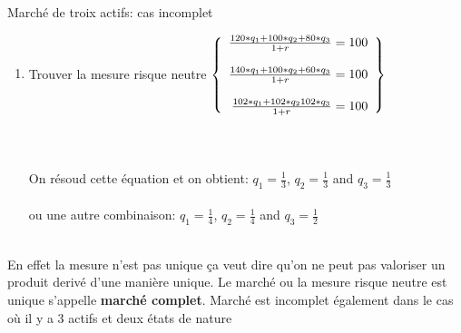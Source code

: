\documentclass[10pt]{beamer}
\begin{document}
\begin{frame}{Marché de troix actifs: cas incomplet}{}
\small{
    \begin{enumerate}
      \item Trouver la mesure risque neutre
      \begin{math}
       
        \left\{
        \begin{array}{r c l}

            \frac{120*q_{1} + 100*q_{2} + 80*q_{3}}{1+r} = 100 \\~\\ 
            
            \frac{140*q_{1} + 100*q_{2} + 60*q_{3}}{1+r} = 100 \\~\\ 

            \frac{102*q_{1} + 102*q_{2} 102*q_{3}}{1+r} = 100 \\ 
       \end{array}
       \right\}
      \end{math} \\~\\ \\~\\
  
    On résoud cette équation et on obtient: $q_{1} = \frac{1}{3}$, $q_{2} =\frac{1}{3}$ and $q_{3} = \frac{1}{3}$ \\~\\
    ou une autre combinaison:
    $q_{1} = \frac{1}{4}$, $q_{2} =\frac{1}{4}$ and $q_{3} = \frac{1}{2}$ \\~\\
  
    \end{enumerate}

 }
  
  En effet la mesure n'est pas unique ça veut dire qu'on ne peut pas valoriser un produit derivé d'une manière unique. Le marché ou la mesure risque neutre est unique s'appelle \textbf{marché complet}. Marché est incomplet également dans le cas où il y a 3 actifs et deux états de nature
  
\end{frame}
\end{document}
